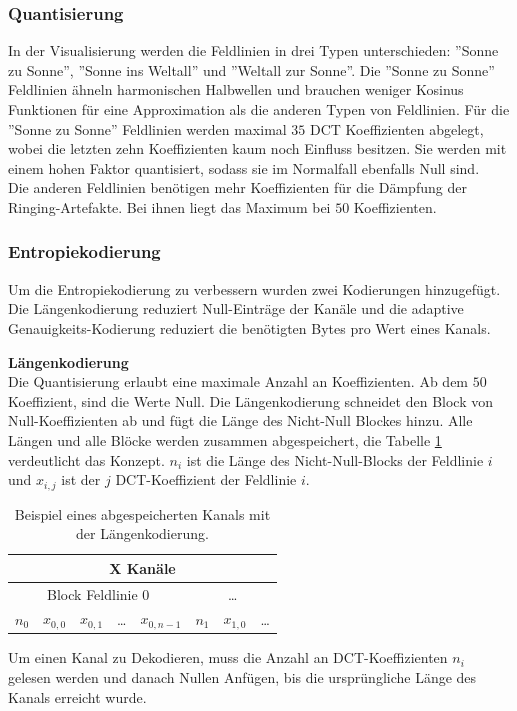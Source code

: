 \subsubsection{Quantisierung}
In der Visualisierung werden die Feldlinien in drei Typen unterschieden: ''Sonne zu Sonne'', ''Sonne ins Weltall'' und ''Weltall zur Sonne''.  Die ''Sonne zu Sonne'' Feldlinien ähneln harmonischen Halbwellen und brauchen weniger Kosinus Funktionen für eine Approximation als die anderen Typen von Feldlinien. Für die ''Sonne zu Sonne'' Feldlinien werden maximal $35$ DCT Koeffizienten abgelegt, wobei die letzten zehn Koeffizienten kaum noch Einfluss besitzen. Sie werden mit einem hohen Faktor quantisiert, sodass sie im Normalfall ebenfalls Null sind.\\
Die anderen Feldlinien benötigen mehr Koeffizienten für die Dämpfung der Ringing-Artefakte. Bei ihnen liegt das Maximum bei $50$ Koeffizienten.

\subsubsection{Entropiekodierung}\label{konzept:loesung1:kodierung}
Um die Entropiekodierung zu verbessern wurden zwei Kodierungen hinzugefügt. Die Längenkodierung reduziert Null-Einträge der Kanäle und die adaptive Genauigkeits-Kodierung reduziert die benötigten Bytes pro Wert eines Kanals.

\textbf{Längenkodierung}\\
Die Quantisierung erlaubt eine maximale Anzahl an Koeffizienten. Ab dem $50$ Koeffizient, sind die Werte Null. Die Längenkodierung schneidet den Block von Null-Koeffizienten ab und fügt die Länge des Nicht-Null Blockes hinzu. Alle Längen und alle Blöcke werden zusammen abgespeichert, die Tabelle \ref{konzept:loesung1:entropie:laengenkodierung} verdeutlicht das Konzept. $n_i$ ist die Länge des Nicht-Null-Blocks der Feldlinie $i$ und $x_{i,j}$ ist der $j$ DCT-Koeffizient der Feldlinie $i$.

\begin{table}[!htbp]
	\center
	\begin{tabular}{||c|c|c|c|c||c|c|c}
		\hline
		\multicolumn{8}{|c|}{X Kanäle}\\\hline\hline
		 \multicolumn{5}{||c||}{Block Feldlinie 0} & \multicolumn{3}{c}{\ldots} \\\hline
		$n_0$ &$x_{0,0}$ &$x_{0,1}$ & \ldots & $x_{0,n-1}$ & $n_1$ & $x_{1,0}$ & \ldots\\\hline
	\end{tabular}
	\caption{Beispiel eines abgespeicherten Kanals mit der Längenkodierung.}
	\label{konzept:loesung1:entropie:laengenkodierung}
\end{table}
Um einen Kanal zu Dekodieren, muss die Anzahl an DCT-Koeffizienten $n_i$ gelesen werden und danach Nullen Anfügen, bis die ursprüngliche Länge des Kanals erreicht wurde.

